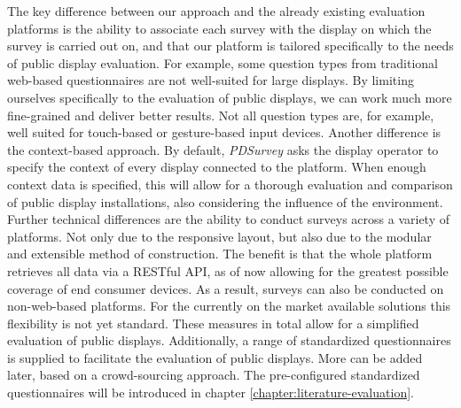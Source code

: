 	The key difference between our approach and the already existing evaluation platforms is the ability to associate each survey with the display on which the survey is carried out on, and that our platform is tailored specifically to the needs of public display evaluation. For example, some question types from traditional web-based questionnaires are not well-suited for large displays. By limiting ourselves specifically to the evaluation of public displays, we can work much more fine-grained and deliver better results. Not all question types are, for example, well suited for touch-based or gesture-based input devices. 
	Another difference is the context-based approach. By default, \textit{PDSurvey} asks the display operator to specify the context of every display connected to the platform. When enough context data is specified, this will allow for a thorough evaluation and comparison of public display installations, also considering the influence of the environment.
	Further technical differences are the ability to conduct surveys across a variety of platforms. Not only due to the responsive layout, but also due to the modular and extensible method of construction. The benefit is that the whole platform retrieves all data via a RESTful API, as of now allowing for the greatest possible coverage of end consumer devices. As a result, surveys can also be conducted on non-web-based platforms. For the currently on the market available solutions this flexibility is not yet standard.
	These measures in total allow for a simplified evaluation of public displays. Additionally, a range of standardized questionnaires is supplied to facilitate the evaluation of public displays. More can be added later, based on a crowd-sourcing approach. The pre-configured standardized questionnaires will be introduced in chapter \ref{chapter:literature-evaluation}.





